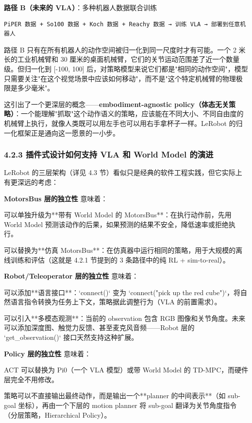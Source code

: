 \documentclass[UTF8,a4paper,11pt]{ctexart}
\begin{document}
\textbf{路径 B（未来的 VLA）}：多种机器人数据联合训练
\begin{lstlisting}[language=text]
PiPER 数据 + So100 数据 + Koch 数据 + Reachy 数据 → 训练 VLA → 部署到任意机器人
\end{lstlisting}

路径 B 只有在所有机器人的动作空间被归一化到同一尺度时才有可能。一个 2 米长的工业机械臂和 30 厘米的桌面机械臂，它们的关节运动范围差了近一个数量级。但归一化到 [-100, 100] 后，对策略模型来说它们都是"相同的动作空间"，模型只需要关注"在这个视觉场景中应该如何移动"，而不是"这个特定机械臂的物理极限是多少毫米"。

这引出了一个更深层的概念——\textbf{embodiment-agnostic policy（体态无关策略）}：一个能理解"抓取"这个动作语义的策略，应该能在不同大小、不同自由度的机械臂上执行，就像人类既可以用左手也可以用右手拿杯子一样。LeRobot 的归一化框架正是通向这一愿景的一小步。

\subsubsection{4.2.3 插件式设计如何支持 VLA 和 World Model 的演进}

LeRobot 的三层架构（详见 4.3 节）看似只是经典的软件工程实践，但它实际上有更深远的考虑：

\textbf{MotorsBus 层的独立性} 意味着：
\item 可以单独升级为**带有 World Model 的 MotorsBus**：在执行动作前，先用 World Model 预测该动作的后果，如果预测的结果不安全，降低速率或拒绝执行。
\item 可以替换为**仿真 MotorsBus**：在仿真器中运行相同的策略，用于大规模的离线训练和评估（这就是 4.2.1 节提到的 3 条路径中的纯 RL + sim-to-real）。

\textbf{Robot/Teleoperator 层的独立性} 意味着：
\item 可以添加**语言接口**：`connect()` 变为 `connect("pick up the red cube")`，将自然语言指令转换为任务上下文，策略据此调整行为（VLA 的前置需求）。
\item 可以引入**多模态观测**：当前的 observation 包含 RGB 图像和关节角度。未来可以添加深度图、触觉力反馈、甚至麦克风音频——Robot 层的 `get_observation()` 接口天然支持这种扩展。

\textbf{Policy 层的独立性} 意味着：
\item ACT 可以替换为 Pi0（一个 VLA 模型）或带 World Model 的 TD-MPC，而硬件层完全不用修改。
\item 策略可以不直接输出最终动作，而是输出一个**planner 的中间表示**（如 sub-goal 坐标），再由一个下层的 motion planner 将 sub-goal 翻译为关节角度指令（分层策略，Hierarchical Policy）。
\end{document}
